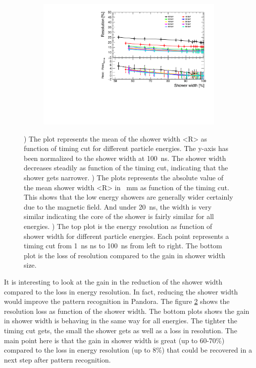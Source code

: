\begin{figure}[htbp!]
  \begin{minipage}{.45\textwidth}
    \centering
    \begin{subfigure}[t]{1\textwidth}
      \centering
      \includegraphics[width=1\linewidth]{chap6/fig_TimingILD/NoSmearing/ShowerWidth_Resolution_noSmearing}
      \vspace{-6ex}
      \caption{}  \label{fig:ShowerWidthResoNoSmearing}
    \end{subfigure}
  \end{minipage}
  \caption{) The plot represents the mean of the shower width <R> as function of timing cut for different particle energies. The y-axis has been normalized to the shower width at \SI{100}{\nano\second}. The shower width decreases steadily as function of the timing cut, indicating that the shower gets narrower. ) The plots represents the absolute value of the mean shower width <R> in \SI{}{\milli\meter} as function of the timing cut. This shows that the low energy showers are generally wider certainly due to the magnetic field. And under \SI{20}{\nano\second}, the width is very similar indicating the core of the shower is fairly similar for all energies. ) The top plot is the energy resolution as function of shower width for different particle energies. Each point represents a timing cut from \SI{1}{\nano\second} ns to \SI{100}{\nano\second} from left to right. The bottom plot is the loss of resolution compared to the gain in shower width size.}
\end{figure}

It is interesting to look at the gain in the reduction of the shower width compared to the loss in energy resolution. In fact, reducing the shower width would improve the pattern recognition in Pandora. The figure \ref{fig:ShowerWidthResoNoSmearing} shows the resolution loss as function of the shower width. The bottom plots shows the gain in shower width is behaving in the same way for all energies. The tighter the timing cut gets, the small the shower gets as well as a loss in resolution. The main point here is that the gain in shower width is great (up to 60-70\%) compared to the loss in energy resolution (up to 8\%) that could be recovered in a next step after pattern recognition.

